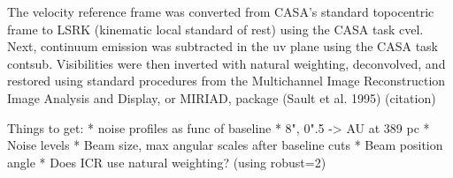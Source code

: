 The velocity reference frame was converted from CASA's standard topocentric frame to LSRK (kinematic local standard of rest) using the CASA task cvel. Next, continuum emission was subtracted in the uv plane using the CASA task contsub. Visibilities were then inverted with natural weighting, deconvolved, and restored using standard procedures from the Multichannel Image Reconstruction Image Analysis and Display, or MIRIAD, package (Sault et al. 1995) (citation)









Things to get:
* noise profiles as func of baseline
* 8", 0".5 -> AU at 389 pc
* Noise levels
* Beam size, max angular scales after baseline cuts
* Beam position angle
* Does ICR use natural weighting? (using robust=2)

